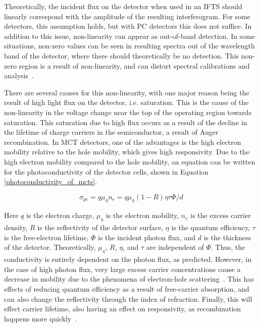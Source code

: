 Theoretically, the incident flux on the detector when used in an IFTS should linearly correspond with the amplitude of the resulting interferogram. For some detectors, this assumption holds, but with PC detectors this does not suffice. In addition to this issue, non-linearity can appear as out-of-band detection. In some situations, non-zero values can be seen in resulting spectra out of the wavelength band of the detector, where there should theoretically be no detection. This non-zero region is a result of non-linearity, and can distort spectral calibrations and analysis~\citep{prac_ex_corr_of_nonlinearity}.

There are several causes for this non-linearity, with one major reason being the result of high light flux on the detector, i.e. saturation. This is the cause of the non-linearity in the voltage change near the top of the operating region towards saturation. This saturation due to high flux occurs as a result of the decline in the lifetime of charge carriers in the semiconductor, a result of Auger recombination. In MCT detectors, one of the advantages is the high electron mobility relative to the hole mobility, which gives high responsivity. Due to the high electron mobility compared to the hole mobility, an equation can be written for the photoconductivity of the detector cells, shown in Equation \ref{photoconductivity_of_mcts}.

\begin{equation}\label{photoconductivity_of_mcts}
    \sigma_{pc} = q \mu_{\eta} n_e = q \mu_{\eta} (1-R)\eta \tau \Phi / d
\end{equation}

Here $q$ is the electron charge, $\mu_{\eta}$ is the electron mobility, $n_e$ is the excess carrier density, $R$ is the reflectivity of the detector surface, $\eta$ is the quantum efficiency, $\tau$ is the free-electron lifetime, $\Phi$ is the incident photon flux, and $d$ is the thickness of the detector. Theoretically, $\mu_{\eta}$, $R$, $\eta$, and $\tau$ are independent of $\Phi$. Thus, the conductivity is entirely dependent on the photon flux, as predicted. However, in the case of high photon flux, very large excess carrier concentrations cause a decrease in mobility due to the phenomena of electron-hole scattering~\citep{hole_mobility_MCTs}. This has effects of reducing quantum efficiency as a result of free-carrier absorption, and can also change the reflectivity through the index of refraction. Finally, this will effect carrier lifetime, also having an effect on responsivity, as recombination happens more quickly~\citep{auger-limited_carrier_lifetimes}.

